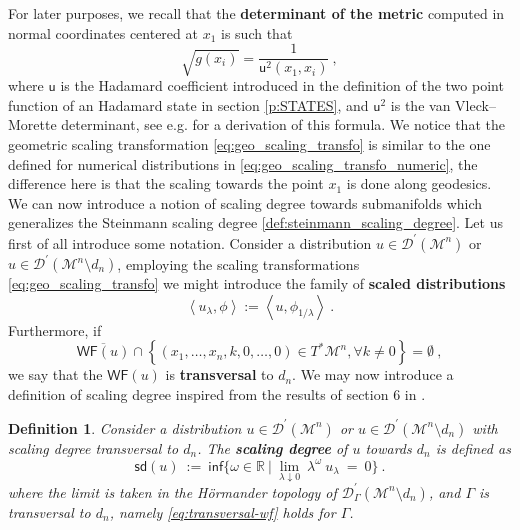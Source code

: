 \documentclass[11pt]{book}
\newcommand{\WF}{\mathsf{WF}}
\newcommand{\sd}{\mathsf{sd}}
\renewcommand{\inf}{\mathsf{inf}}
\newcommand{\sm}[1]{\left\langle#1\right\rangle}
\newcommand{\Dcal}{\mathcal{D}}
\newcommand{\Mcal}{\mathcal{M}}
\newcommand{\Rbb}{\mathbb{R}}
\newcommand{\usf}{\mathsf{u}}
\theoremstyle{break}
\newtheorem{definition}{Definition}[chapter]
\begin{document}
For later purposes, we recall that the \textbf{determinant of the metric} computed in normal coordinates centered at $x_1$ is such that
%
\begin{equation*}
\sqrt{g(x_i)} = \frac{1}{\usf^2(x_1,x_i)} \ , 
\end{equation*}
%
where $\usf$ is the Hadamard coefficient introduced in the definition of the two point function of an Hadamard state in section \ref{p:STATES}, and $\usf^2$ is the van Vleck--Morette determinant, see e.g. \cite{PPV_2011} for a derivation of this formula. We notice that the geometric scaling transformation \eqref{eq:geo_scaling_transfo} is similar to the one defined for numerical distributions in \eqref{eq:geo_scaling_transfo_numeric}, the difference here is that the scaling towards the point $x_1$ is done along geodesics. We can now introduce a notion of scaling degree towards submanifolds which generalizes the  Steinmann scaling degree \ref{def:steinmann_scaling_degree}. Let us first of all introduce some notation.  Consider a distribution $u \in \Dcal^\prime(\Mcal^n)$ or $u \in \Dcal^\prime(\Mcal^n \setminus d_n)$, employing the scaling transformations \eqref{eq:geo_scaling_transfo} we might introduce the family of \textbf{scaled distributions} 
%
\begin{equation*}
\sm{u_\lambda,\phi} := \sm{u,\phi_{1/\lambda}} \ . 
\end{equation*}
% 
Furthermore, if 
%
\begin{equation}\label{eq:transversal-wf}
\overline{\WF(u)}\cap \left\{(x_1,\dots, x_n,k,0,\dots,0)\in T^*\Mcal^n, \forall k\neq 0 \right\} = \emptyset \ ,    
\end{equation}
%
we say that the $\WF(u)$ is \textbf{transversal} to $d_n$. We may now introduce a definition of scaling degree inspired from the results of section 6 in \cite{BF_2000} .


\begin{definition}\label{def:scaling_degree}
Consider a distribution $u \in \Dcal^\prime(\Mcal^n)$ or $u \in \Dcal^\prime(\Mcal^n \setminus d_n)$ with scaling degree transversal to $d_n$. The \textbf{scaling degree} of $u$ towards $d_n$ is defined as 
%
\begin{equation*}
\sd(u) \ := \ \inf\bigg\{ \omega \in \Rbb \ \bigg| \ \lim_{\lambda \downarrow 0} \ \lambda^\omega \ u_\lambda \ = \ 0 \bigg\} \ .
\end{equation*}
%
where the limit is taken in the H\"ormander topology of $\mathcal{D}^\prime_\Gamma(\Mcal^n\setminus d_n)$, and 
$\Gamma$ is transversal to $d_n$, namely \eqref{eq:transversal-wf} holds for $\Gamma$.
%
\end{definition}
\end{document}
